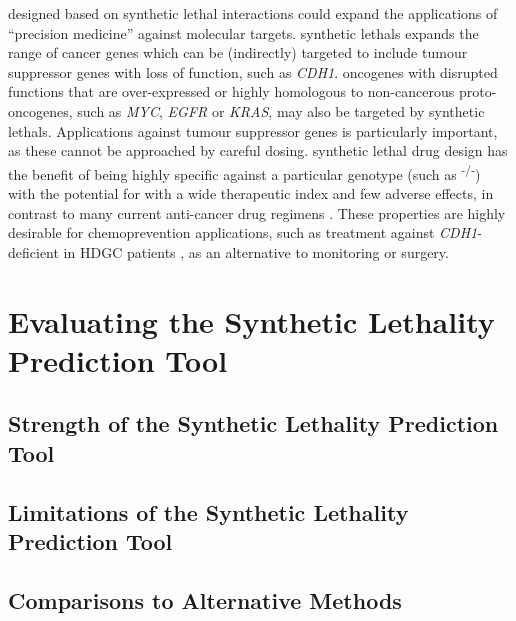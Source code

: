  designed based on \gls{synthetic lethal} interactions could expand the applications of ``precision medicine'' against molecular targets. %
\Glspl{synthetic lethal} expands the range of cancer genes which can be (indirectly) targeted to include \gls{tumour suppressor} genes with loss of function, such as \textit{CDH1}. \Glspl{oncogene} with disrupted functions that are over-expressed or highly homologous to non-cancerous \glspl{proto-oncogene}, such as \textit{MYC}, \textit{EGFR} or \textit{KRAS}, may also be targeted by \glspl{synthetic lethal}. Applications against \gls{tumour suppressor} genes is particularly important, as these cannot be approached by careful dosing. \Gls{synthetic lethal} drug design has the benefit of being highly specific against a particular genotype (such as \textsuperscript{-/-}) with the potential for  with a wide therapeutic index and few adverse effects, in contrast to many current anti-cancer drug regimens \citep{Hopkins2008, Kaelin2009}. These properties are highly desirable for \gls{chemoprevention} applications, such as \gls{treatment} against \textit{CDH1}-deficient in \gls{HDGC} patients \citep{Guilford2010}, as an alternative to monitoring or surgery.

\iffalse
\section{Evaluating the Synthetic Lethality Prediction Tool}
\label{chapt6:slipt}


\subsection{Strength of the Synthetic Lethality Prediction Tool}
\label{chapt6:slipt_strengths}

\subsection{Limitations of the Synthetic Lethality Prediction Tool}
\label{chapt6:slipt_limitations}

\subsection{Comparisons to Alternative Methods}
\label{chapt6:slipt_compare}

